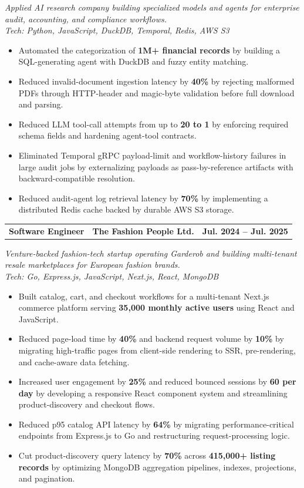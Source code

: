 \documentclass[letterpaper,11pt]{article}
\makeatletter
\newcommand{\customSubheading}[3]{ %
  \vspace{-2pt}\item
    \begin{tabular*}{1.0\textwidth}{@{}c@{\extracolsep{\fill}}c@{\extracolsep{\fill}}c@{}}
      {\small \textbf{#1}} & {\small \textbf{#2}} & {\small \textbf{#3}} \\
    \end{tabular*}\vspace{-7pt}
}
\newcommand{\resumeItem}[1]{%
  \item\small{#1}%
}
\newcommand{\resumeItemListStart}[1][leftmargin=1em]{%
  \begin{itemize}[#1, itemsep=1pt, parsep=0pt, partopsep=0pt, topsep=3pt]%
}
\newcommand{\resumeItemListEnd}{\end{itemize}\vspace{-5pt}}
\makeatother
\begin{document}
\vspace{-12pt}
{\footnotesize \textit{Applied AI research company building specialized models and agents for enterprise audit, accounting, and compliance workflows.}}
\\[-1pt]
{\footnotesize \textit{Tech: Python, JavaScript, DuckDB, Temporal, Redis, AWS S3}}
\vspace{-10pt}
\resumeItemListStart[leftmargin=1em]
\resumeItem{Automated the categorization of \textbf{1M+ financial records} by building a SQL-generating agent with DuckDB and fuzzy entity matching.}
\resumeItem{Reduced invalid-document ingestion latency by \textbf{40\%} by rejecting malformed PDFs through HTTP-header and magic-byte validation before full download and parsing.}
\resumeItem{Reduced LLM tool-call attempts from up to \textbf{20 to 1} by enforcing required schema fields and hardening agent-tool contracts.}
\resumeItem{Eliminated Temporal gRPC payload-limit and workflow-history failures in large audit jobs by externalizing payloads as pass-by-reference artifacts with backward-compatible resolution.}
\resumeItem{Reduced audit-agent log retrieval latency by \textbf{70\%} by implementing a distributed Redis cache backed by durable AWS S3 storage.}
\resumeItemListEnd

\customSubheading
  {Software Engineer}{The Fashion People Ltd.}
  {Jul. 2024 -- Jul. 2025}

\vspace{-12pt}
{\footnotesize \textit{Venture-backed fashion-tech startup operating Garderob and building multi-tenant resale marketplaces for European fashion brands.}}
\\[-1pt]
{\footnotesize \textit{Tech: Go, Express.js, JavaScript, Next.js, React, MongoDB}}
\vspace{-10pt}

\resumeItemListStart[leftmargin=1em]
\resumeItem{Built catalog, cart, and checkout workflows for a multi-tenant Next.js commerce platform serving \textbf{35,000 monthly active users} using React and JavaScript.}
\resumeItem{Reduced page-load time by \textbf{40\%} and backend request volume by \textbf{10\%} by migrating high-traffic pages from client-side rendering to SSR, pre-rendering, and cache-aware data fetching.}
\resumeItem{Increased user engagement by \textbf{25\%} and reduced bounced sessions by \textbf{60 per day} by developing a responsive React component system and streamlining product-discovery and checkout flows.}
\resumeItem{Reduced p95 catalog API latency by \textbf{64\%} by migrating performance-critical endpoints from Express.js to Go and restructuring request-processing logic.}
\resumeItem{Cut product-discovery query latency by \textbf{70\%} across \textbf{415,000+ listing records} by optimizing MongoDB aggregation pipelines, indexes, projections, and pagination.}
\resumeItemListEnd
\end{document}
